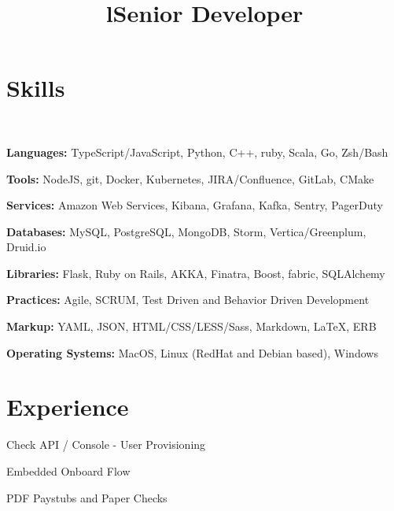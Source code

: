 \documentclass[12pt, tweaklist, line]{res}
\title{l}\dates{r}\\
\let\tempone\itemize
\let\temptwo\enditemize
\renewenvironment{itemize}{\tempone\vspace{-.15in}\setlength{\topsep}{0pt}\setlength{\itemsep}{3pt}\vspace{-.15in}}{\temptwo}
\def\Cplusplus{C++}
\begin{document}

\begin{resume}

\section{Skills}

~\\ %

\begin{itemize}
\item \textbf{Languages:} TypeScript/JavaScript, Python, \Cplusplus, ruby, Scala, Go, Zsh/Bash
\item \textbf{Tools:} NodeJS, git, Docker, Kubernetes, JIRA/Confluence, GitLab, CMake
\item \textbf{Services:} Amazon Web Services, Kibana, Grafana, Kafka, Sentry, PagerDuty
\item \textbf{Databases:} MySQL, PostgreSQL, MongoDB, Storm, Vertica/Greenplum, Druid.io
\item \textbf{Libraries:} Flask, Ruby on Rails, AKKA, Finatra, Boost, fabric, SQLAlchemy
\item \textbf{Practices:} Agile, SCRUM, Test Driven and Behavior Driven Development
\item \textbf{Markup:} YAML, JSON, HTML/CSS/LESS/Sass, Markdown, \LaTeX, ERB
\item \textbf{Operating Systems:} MacOS, Linux (RedHat and Debian based), Windows
\end{itemize}

\section{Experience}

\title{Senior Developer}
\begin{position}
\begin{itemize}
\item Check API / Console - User Provisioning
\item Embedded Onboard Flow
\item PDF Paystubs and Paper Checks
\end{itemize}
\end{position}


\end{resume}
\end{document}
